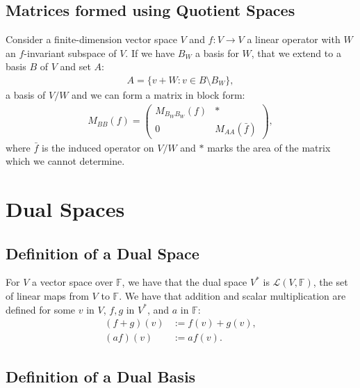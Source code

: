 \documentclass[a4paper, 12pt, twoside]{article}
\begin{document}
\newpage

\subsection{Matrices formed using Quotient Spaces}

Consider a finite-dimension vector space $V$ and $f : V \to V$ a linear
operator with $W$ an $f$-invariant subspace of $V$. 
If we have $B_W$ a basis for $W$, that we extend to a basis $B$ of 
$V$ and set $A$: \begin{gather*}
  A = \{v + W : v \in B \setminus B_W \},
\end{gather*} a basis of $V/W$ and we can form
a matrix in block form: \begin{gather*}
  M_{BB}(f) = \begin{pmatrix}
    M_{B_WB_W}(f) & * \\
    0 & M_{AA}(\bar{f})
  \end{pmatrix},
\end{gather*} where $\bar{f}$ is the induced operator on $V/W$ and $*$
marks the area of the matrix which we cannot determine.

\section{Dual Spaces}

\subsection{Definition of a Dual Space}

For $V$ a vector space over $\mathbb{F}$, we have that the dual space
$V^*$ is $\mathcal{L}(V, \mathbb{F})$, the set of linear maps from 
$V$ to $\mathbb{F}$. We have that addition and scalar multiplication
are defined for some $v$ in $V$, $f, g$ in $V^*$, and $a$ in 
$\mathbb{F}$: \begin{align*}
  (f + g)(v) &:= f(v) + g(v), \\
  (af)(v) &:= af(v).
\end{align*}

\subsection{Definition of a Dual Basis}
\end{document}
